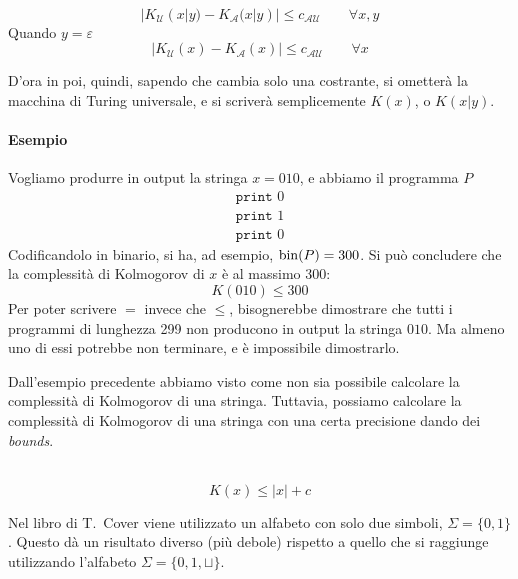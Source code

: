 \begin{corollary}
    ~
    $$
        |K_\mathcal{U}(x|y) - K_\mathcal{A}(x|y)| \leq c_{\mathcal{A}\mathcal{U}} \qquad \forall x,y
    $$
    Quando $y=\varepsilon$
    $$
        |K_\mathcal{U}(x) - K_\mathcal{A}(x)| \leq c_{\mathcal{A}\mathcal{U}} \qquad \forall x
    $$
\end{corollary}
D'ora in poi, quindi, sapendo che cambia solo una costrante, si ometterà la macchina di Turing universale, e si scriverà semplicemente $K(x)$, o $K(x|y)$.

\paragraph{Esempio} Vogliamo produrre in output la stringa $x=010$, e abbiamo il programma $P$
\begin{align*}
    \texttt{print }0\\
    \texttt{print }1\\
    \texttt{print }0
\end{align*}
Codificandolo in binario, si ha, ad esempio, $\operatorname*{bin}(P)=300$. Si può concludere che la complessità di Kolmogorov di $x$ è al massimo 300:
$$
    K(010) \leq 300
$$
Per poter scrivere $=$ invece che $\leq$, bisognerebbe dimostrare che tutti i programmi di lunghezza 299 non producono in output la stringa $010$. Ma almeno uno di essi potrebbe non terminare, e è impossibile dimostrarlo.\bigskip

Dall'esempio precedente abbiamo visto come non sia possibile calcolare la complessità di Kolmogorov di una stringa. Tuttavia, possiamo calcolare la complessità di Kolmogorov di una stringa con una certa precisione dando dei \emph{bounds}.

\begin{theorem}~
    $$
        K(x) \leq |x| + c
    $$    
\end{theorem}
Nel libro di T.~Cover viene utilizzato un alfabeto con solo due simboli, $\Sigma=\{0,1\}$. Questo dà un risultato diverso (più debole) rispetto a quello che si raggiunge utilizzando l'alfabeto $\Sigma=\{0,1,\sqcup\}$.

